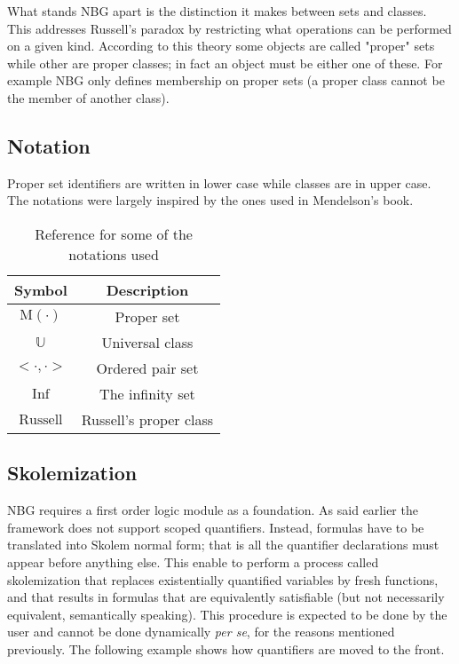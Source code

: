 \documentclass[acmlarge]{acmart}
\begin{document}
What stands NBG apart is the distinction it makes between sets and classes. This addresses Russell's paradox by restricting what operations can be performed on a given kind. According to this theory some objects are called "proper" sets while other are proper classes; in fact an object must be either one of these. For example NBG only defines membership on proper sets (a proper class cannot be the member of another class).

\subsection{Notation}

Proper set identifiers are written in lower case while classes are in upper case. The notations were largely inspired by the ones used in Mendelson's book.

\begin{table}[h!]
\centering
\begin{tabular}{|| c | c ||}
 \hline
 Symbol & Description \\ [0.5ex]
 \hline\hline
 $\text{M}(\cdot)$ & Proper set \\
 $\mathbb{U}$ & Universal class \\
 $<\cdot, \cdot>$ & Ordered pair set \\
 $\text{Inf}$ & The infinity set \\
 $\text{Russell}$ & Russell's proper class \\
 \hline
\end{tabular}
\caption{Reference for some of the notations used}
\label{table:1}
\end{table}

\subsection{Skolemization}

NBG requires a first order logic module as a foundation. As said earlier the framework does not support scoped quantifiers. Instead, formulas have to be translated into Skolem normal form; that is all the quantifier declarations must appear before anything else. This enable to perform a process called skolemization that replaces existentially quantified variables by fresh functions, and that results in formulas that are equivalently satisfiable (but not necessarily equivalent, semantically speaking). This procedure is expected to be done by the user and cannot be done dynamically \emph{per se}, for the reasons mentioned previously. The following example shows how quantifiers are moved to the front.
\end{document}
